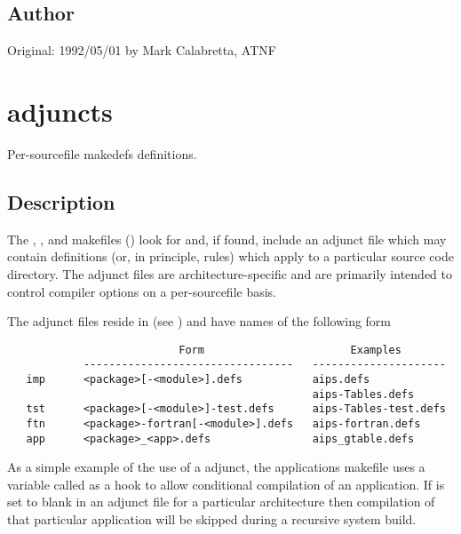 \subsection*{Author}

Original: 1992/05/01 by Mark Calabretta, ATNF


\newpage
\section{ adjuncts}
\label{makedefs adjuncts}
 
Per-sourcefile makedefs definitions.
 
\subsection*{Description}

The , ,  and  makefiles
() look for and, if found, include an adjunct 
file which may contain definitions (or, in principle, rules) which apply to a
particular source code directory.  The adjunct files are architecture-specific
and are primarily intended to control compiler options on a per-sourcefile
basis.

The adjunct files reside in  (see ) and have
names of the following form

\begin{verbatim}
                           Form                       Examples
            ---------------------------------   ---------------------
   imp      <package>[-<module>].defs           aips.defs
                                                aips-Tables.defs
   tst      <package>[-<module>]-test.defs      aips-Tables-test.defs
   ftn      <package>-fortran[-<module>].defs   aips-fortran.defs
   app      <package>_<app>.defs                aips_gtable.defs
\end{verbatim}

\noindent
As a simple example of the use of a  adjunct, the applications
makefile uses a variable called  as a hook to allow conditional
compilation of an application.  If  is set to blank in an adjunct
file for a particular architecture then compilation of that particular
application will be skipped during a recursive system build.

